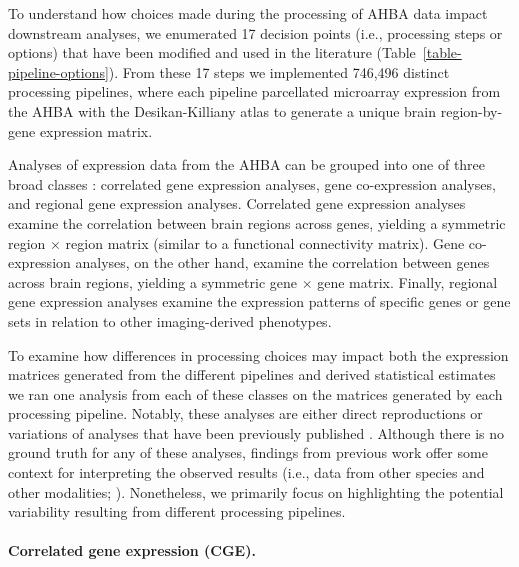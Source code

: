 \documentclass[12pt,aps,pra,reprint,showkeys]{revtex4-1}
\begin{document}
To understand how choices made during the processing of AHBA data impact downstream analyses, we enumerated 17 decision points (i.e., processing steps or options) that have been modified and used in the literature (Table~\ref{table-pipeline-options}).
From these 17 steps we implemented 746,496 distinct processing pipelines, where each pipeline parcellated microarray expression from the AHBA with the Desikan-Killiany atlas \citep{desikan2006automated} to generate a unique brain region-by-gene expression matrix.

Analyses of expression data from the AHBA can be grouped into one of three broad classes \citep{fornito2019tics}: correlated gene expression analyses, gene co-expression analyses, and regional gene expression analyses.
Correlated gene expression analyses examine the correlation between brain regions across genes, yielding a symmetric region $\times$ region matrix (similar to a functional connectivity matrix).
Gene co-expression analyses, on the other hand, examine the correlation between genes across brain regions, yielding a symmetric gene $\times$ gene matrix.
Finally, regional gene expression analyses examine the expression patterns of specific genes or gene sets in relation to other imaging-derived phenotypes.

To examine how differences in processing choices may impact both the expression matrices generated from the different pipelines and derived statistical estimates we ran one analysis from each of these classes on the matrices generated by each processing pipeline.
Notably, these analyses are either direct reproductions or variations of analyses that have been previously published \citep{arnatkeviciute2019neuroimage, oldham2008natneuro, hawrylycz2012nature, burt2018natneuro}.
Although there is no ground truth for any of these analyses, findings from previous work offer some context for interpreting the observed results (i.e., data from other species and other modalities; \citealt{lau2021neuroimage}).
Nonetheless, we primarily focus on highlighting the potential variability resulting from different processing pipelines.

\paragraph*{Correlated gene expression (CGE).}
\end{document}
